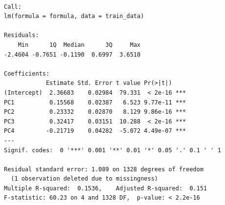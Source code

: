 \documentclass[
  letterpaper,
  DIV=11,
  numbers=noendperiod]{scrartcl}
\newenvironment{Shaded}{\begin{snugshade}}{\end{snugshade}}
\newcommand{\AttributeTok}[1]{\textcolor[rgb]{0.40,0.45,0.13}{#1}}
\newcommand{\CommentTok}[1]{\textcolor[rgb]{0.37,0.37,0.37}{#1}}
\newcommand{\ConstantTok}[1]{\textcolor[rgb]{0.56,0.35,0.01}{#1}}
\newcommand{\DecValTok}[1]{\textcolor[rgb]{0.68,0.00,0.00}{#1}}
\newcommand{\FunctionTok}[1]{\textcolor[rgb]{0.28,0.35,0.67}{#1}}
\newcommand{\NormalTok}[1]{\textcolor[rgb]{0.00,0.23,0.31}{#1}}
\newcommand{\OtherTok}[1]{\textcolor[rgb]{0.00,0.23,0.31}{#1}}
\newcommand{\SpecialCharTok}[1]{\textcolor[rgb]{0.37,0.37,0.37}{#1}}
\begin{document}
\begin{verbatim}

Call:
lm(formula = formula, data = train_data)

Residuals:
    Min      1Q  Median      3Q     Max 
-2.4604 -0.7651 -0.1190  0.6997  3.6510 

Coefficients:
            Estimate Std. Error t value Pr(>|t|)    
(Intercept)  2.36683    0.02984  79.331  < 2e-16 ***
PC1          0.15568    0.02387   6.523 9.77e-11 ***
PC2          0.23332    0.02870   8.129 9.86e-16 ***
PC3          0.32417    0.03151  10.288  < 2e-16 ***
PC4         -0.21719    0.04282  -5.072 4.49e-07 ***
---
Signif. codes:  0 '***' 0.001 '**' 0.01 '*' 0.05 '.' 0.1 ' ' 1

Residual standard error: 1.089 on 1328 degrees of freedom
  (1 observation deleted due to missingness)
Multiple R-squared:  0.1536,    Adjusted R-squared:  0.151 
F-statistic: 60.23 on 4 and 1328 DF,  p-value: < 2.2e-16
\end{verbatim}

\begin{Shaded}
\end{Shaded}
\end{document}
